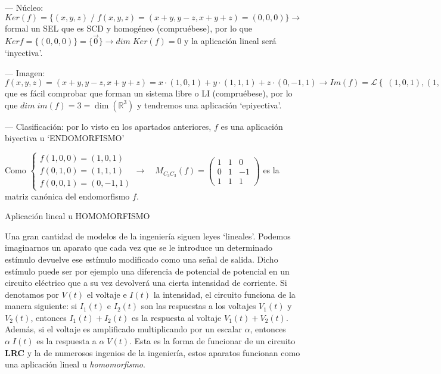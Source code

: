 \begin{proofw}\renewcommand{\qedsymbol}{$\diamond$}
	--- Núcleo: $Ker (f)=\{(x,y,z)\; / \;f(x,y,z)=(x+y,y-z,x+y+z)=(0,0,0) \} \to$ formal un SEL que es SCD y homogéneo (compruébese), por lo que $Ker f=\{(0,0,0)\}=\{ \vec 0\} \to dim \; Ker(f)=0$ y la aplicación lineal será `inyectiva'.
	
\noindent --- Imagen: $f(x,y,z)=(x+y,y-z,x+y+z)=x\cdot (1,0,1)+y \cdot (1,1,1)+ z\cdot (0,-1,1) \to Im(f)=\mathcal L \left\{\; (1,0,1), (1,1,1), (0,-1,1) \right\}$ que es fácil comprobar que forman un sistema libre o LI (compruébese), por lo que $dim\; im(f)=3=\dim(\mathbb R^3)$ y tendremos una aplicación `epiyectiva'.

\noindent--- Clasificación: por lo visto en los apartados anteriores, $f$ es una aplicación biyectiva u `ENDOMORFISMO'

\noindent \textcolor{gris}{Como $\begin{cases} f(1,0,0)=(1,0,1)\\f(0,1,0)=(1,1,1)\\f(0,0,1)=(0,-1,1) \end{cases} \to \quad M_{C_3C_3}(f)= \left( \begin{matrix} 1&1&0\\0&1&-1\\1&1&1 \end{matrix} \right)$ es la matriz canónica del endomorfismo $f$.}
\end{proofw}



\begin{myexampleblock}{Aplicación lineal u HOMOMORFISMO}

Una gran cantidad de modelos de la ingeniería siguen leyes `lineales'. Podemos imaginarnos un aparato que cada vez que se le introduce un determinado estímulo devuelve ese estímulo modificado como una señal de salida. Dicho estímulo puede ser por ejemplo una diferencia de potencial de potencial en un circuito eléctrico que a su vez devolverá una cierta intensidad de corriente. Si denotamos por $V (t)$ el voltaje e $I(t)$ la intensidad, el circuito funciona de la manera siguiente: si $I_1(t)$ e $I_2(t)$ son las respuestas a los voltajes $V_1(t)$ y $V_2(t)$, entonces $I_1(t) + I_2(t)$ es la respuesta al voltaje $V_1(t) + V_2(t)$.  Además, si el voltaje es amplificado multiplicando por un escalar $\alpha$, entonces $\alpha \;I(t)$ es la respuesta a $\alpha \; V (t)$. Esta es la forma de funcionar de un circuito \textbf{LRC} y la de numerosos ingenios de la ingeniería, estos aparatos funcionan como una aplicación lineal u \emph{homomorfismo}. 

\end{myexampleblock}



